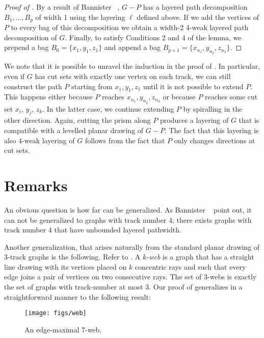 \documentclass{patmorin}
\begin{document}
\begin{proof}[Proof of ]
  By a result of Bannister \etal\ \cite[Proof of
  Theorem~5]{bannister.devanny.ea:track}, $G-P$ has a layered
  path decomposition $B_1,\ldots,B_p$ of width 1 using the layering 
  $\ell$ defined above.  If we add the vertices of $P$ to every bag
  of this decomposition we obtain a width-2 4-weak layered path
  decomposition of $G$.  Finally, to satisfy Conditions 2 and 4 of
  the lemma, we prepend a bag $B_0=\{x_1,y_1,z_1\}$ and append a bag
  $B_{p+1}=\{x_{n_1},y_{n_2},z_{n_3}\}$.
\end{proof}

We note that it is possible to unravel the induction in the proof of
.  In particular, even if $G$ has cut sets with exactly one
vertex on each track, we can still construct the path $P$ starting from
$x_1,y_1,z_1$ until it is not possible to extend $P$. This happens either
because $P$ reaches $x_{n_1},y_{n_2},z_{n_3}$ or because $P$ reaches some
cut set $x_i$, $y_j$, $z_k$.  In the latter case, we continue extending
$P$ by spiralling in the other direction.  Again, cutting the prism along
$P$ produces a layering of $G$ that is compatible with a levelled planar
drawing of $G-P$.  The fact that this layering is also 4-weak layering
of $G$ follows from the fact that $P$ only changes directions at cut sets.


\section{Remarks}

An obvious question is how far  can be generalized. As
Bannister \etal\ \cite{bannister.devanny.ea:track} point out, it can
not be generalized to graphs with track number 4; there exists graphs
with track number 4 that have unbounded layered pathwidth.

Another generalization, that arises naturally from the standard planar
drawing of 3-track graphs is the following. Refer to .
A \emph{$k$-web} is a graph that has a straight line drawing with its
vertices placed on $k$ concentric rays and such that every edge joins a
pair of vertices on two consecutive rays.  The set of 3-webs is exactly
the set of graphs with track-number at most 3.  Our proof of 
generalizes in a straightforward manner to the following result:

\begin{figure}
  \begin{center}
    \texttt{[image: figs/web]}
  \end{center}
  \caption{An edge-maximal 7-web.}
\end{figure}
\end{document}
